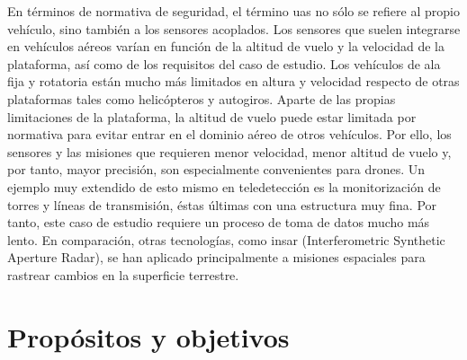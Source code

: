 En términos de normativa de seguridad, el término \acrshort{uas} no sólo se refiere al propio vehículo, sino también a los sensores acoplados. Los sensores que suelen integrarse en vehículos aéreos varían en función de la altitud de vuelo y la velocidad de la plataforma, así como de los requisitos del caso de estudio. Los vehículos de ala fija y rotatoria están mucho más limitados en altura y velocidad respecto de otras plataformas tales como helicópteros y autogiros. Aparte de las propias limitaciones de la plataforma, la altitud de vuelo puede estar limitada por normativa para evitar entrar en el dominio aéreo de otros vehículos. Por ello, los sensores y las misiones que requieren menor velocidad, menor altitud de vuelo y, por tanto, mayor precisión, son especialmente convenientes para drones. Un ejemplo muy extendido de esto mismo en teledetección es la monitorización de torres y líneas de transmisión, éstas últimas con una estructura muy fina. Por tanto, este caso de estudio requiere un proceso de toma de datos mucho más lento. En comparación, otras tecnologías, como \acrshort{insar} (Interferometric Synthetic Aperture Radar), se han aplicado principalmente a misiones espaciales para rastrear cambios en la superficie terrestre.

\section{Propósitos y objetivos}

